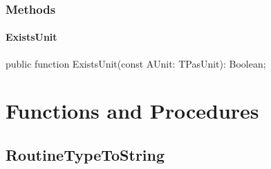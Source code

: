 \documentclass{report}
\newif\ifpdf
\begin{document}
\subsubsection*{\large{\textbf{Methods}}\normalsize\hspace{1ex}\hfill}
\paragraph*{ExistsUnit}\hspace*{\fill}

\label{PasDoc_Items.TPasUnits-ExistsUnit}
\begin{list}{}{
\setlength{\itemindent}{0cm}
\setlength{\listparindent}{0cm}
\setlength{\leftmargin}{\evensidemargin}
\addtolength{\leftmargin}{\tmplength}
\settowidth{\labelsep}{X}
\addtolength{\leftmargin}{\labelsep}
\setlength{\labelwidth}{\tmplength}
}
\item[\textbf{Declaration}\hfill]
\ifpdf
\begin{flushleft}
\fi
\begin{ttfamily}
public function ExistsUnit(const AUnit: TPasUnit): Boolean;\end{ttfamily}

\ifpdf
\end{flushleft}
\fi

\end{list}
\section{Functions and Procedures}
\ifpdf
\subsection*{\large{\textbf{RoutineTypeToString}}\normalsize\hspace{1ex}\hrulefill}
\else
\end{document}
